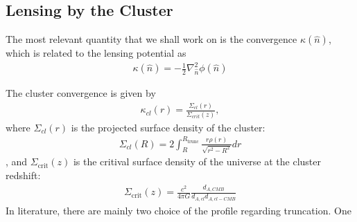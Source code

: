 \documentclass[12pt,letterpaper]{article}
\numberwithin{equation}{section}
\begin{document}
\subsection{\textbf{Lensing by the Cluster}}
The most relevant quantity that we shall work on is the convergence $\kappa (\hat{n})$, which is related to the lensing potential as
\begin{align}
    \kappa(\hat{n}) = -\frac{1}{2}\nabla^2_{\hat{n}}\phi(\hat{n})
\end{align}

The cluster convergence is given by
\begin{align}
    \kappa_{cl}(r) = \frac{\Sigma_{cl}(r)}{\Sigma_{crit}(z)},
\end{align}
where $\Sigma_{cl}(r)$ is the projected surface density of the cluster:
\begin{align}
    \Sigma_{cl}(R) = 2 \int_{R}^{R_{\text{trunc}}}\frac{r\rho(r)}{\sqrt{r^2-R^2}}dr
\end{align},
and $\Sigma_{\text{crit}}(z)$ is the critival surface density of the universe at the cluster redshift:
\begin{align}
    \Sigma_{\text{crit}}(z) = \frac{c^2}{4\pi G}\frac{d_{A,CMB}}{d_{A,cl}d_{A,cl-CMB}}
\end{align}
In literature, there are mainly two choice of the profile regarding truncation. One 

\label{Bibliography}


\end{document}
